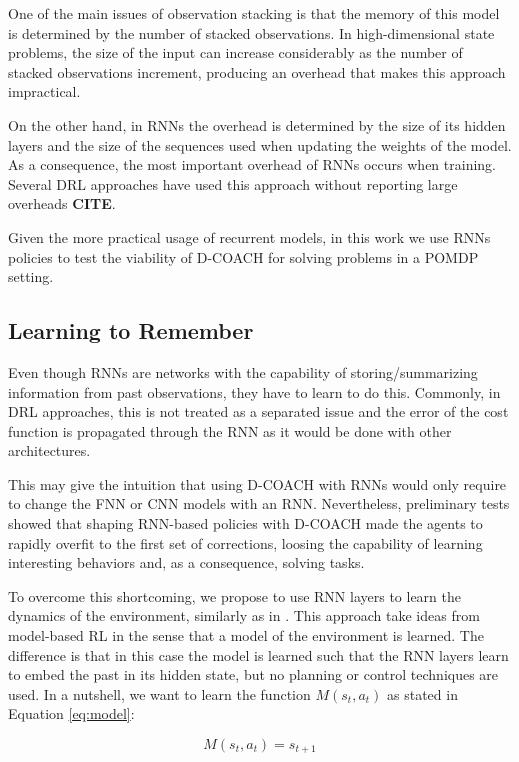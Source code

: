 One of the main issues of observation stacking is that the memory of this model is determined by the number of stacked observations. In high-dimensional state problems, the size of the input can increase considerably as the number of stacked observations increment, producing an overhead that makes this approach impractical. 

On the other hand, in RNNs the overhead is determined by the size of its hidden layers and the size of the sequences used when updating the weights of the model. As a consequence, the most important overhead of RNNs occurs when training. Several DRL approaches have used this approach without reporting large overheads \textbf{CITE}.

Given the more practical usage of recurrent models, in this work we use RNNs policies to test the viability of D-COACH for solving problems in a POMDP setting. 

\subsection{Learning to Remember}
Even though RNNs are networks with the capability of storing/summarizing information from past observations, they have to learn to do this. Commonly, in DRL approaches, this is not treated as a separated issue and the error of the cost function is propagated through the RNN as it would be done with other architectures. 

This may give the intuition that using D-COACH with RNNs would only require to change the FNN or CNN models with an RNN. Nevertheless, preliminary tests showed that shaping RNN-based policies with D-COACH made the agents to rapidly overfit to the first set of corrections, loosing the capability of learning interesting behaviors and, as a consequence, solving tasks. 

To overcome this shortcoming, we propose to use RNN layers to learn the dynamics of the environment, similarly as in \cite{Ha2018}. This approach take ideas from model-based RL in the sense that a model of the environment is learned. The difference is that in this case the model is learned such that the RNN layers learn to embed the past in its hidden state, but no planning or control techniques are used. In a nutshell, we want to learn the function $M(s_{t}, a_{t})$ as stated in Equation \ref{eq:model}:

\begin{equation}
    M(s_{t},a_{t}) = s_{t+1}
\end{equation}



